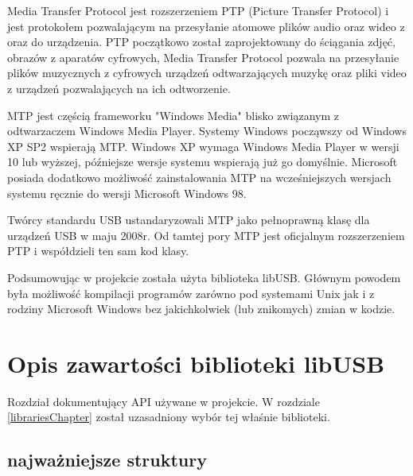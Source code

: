 \documentclass{BscUS}
\begin{document}
Media Transfer Protocol jest rozszerzeniem PTP (Picture Transfer Protocol) i jest protokołem pozwalającym na przesyłanie atomowe plików audio oraz wideo z oraz do urządzenia. PTP początkowo został zaprojektowany do ściągania zdjęć, obrazów z aparatów cyfrowych, Media Transfer Protocol pozwala na przesyłanie plików muzycznych z cyfrowych urządzeń odtwarzających muzykę oraz pliki video z urządzeń pozwalających na ich odtworzenie.

MTP jest częścią frameworku "Windows Media" blisko związanym z odtwarzaczem Windows Media Player. Systemy Windows począwszy od Windows XP SP2 wspierają MTP. Windows XP wymaga Windows Media Player w wersji 10 lub wyższej, późniejsze wersje systemu wspierają już go domyślnie. Microsoft posiada dodatkowo możliwość zainstalowania MTP na wcześniejszych wersjach systemu ręcznie do wersji Microsoft Windows 98.

Twórcy standardu USB ustandaryzowali MTP jako pełnoprawną klasę dla urządzeń USB w maju 2008r.
Od tamtej pory MTP jest oficjalnym rozszerzeniem PTP i współdzieli ten sam kod klasy. \cite{winusbDesc, micrDevAppUSBDev, micrAccUsbDev, micCommWithUsb}
\newline

\indent Podsumowując w projekcie została użyta biblioteka libUSB. Głównym powodem była możliwość kompilacji programów zarówno pod systemami Unix jak i z rodziny Microsoft Windows bez jakichkolwiek (lub znikomych) zmian w kodzie.

\chapter{Opis zawartości biblioteki libUSB}
\label{libUsbChapter}
\indent Rozdział dokumentujący API używane w projekcie. W rozdziale \ref{librariesChapter} został uzasadniony wybór tej właśnie biblioteki. \cite{libusbDoc}
\section{najważniejsze struktury}
\end{document}
